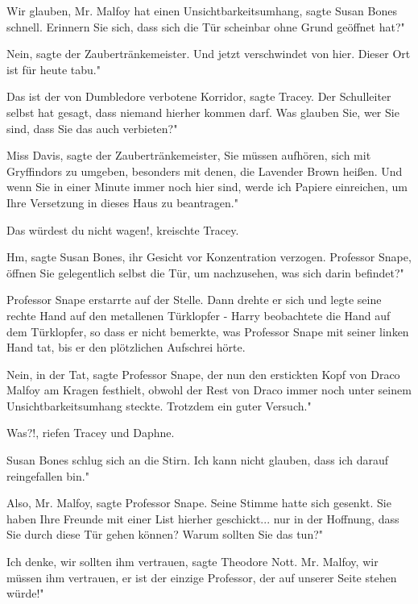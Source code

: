 \glqq Wir glauben, Mr. Malfoy hat einen Unsichtbarkeitsumhang\grqq{}, sagte
Susan Bones schnell. \glqq Erinnern Sie sich, dass sich die Tür scheinbar ohne
Grund geöffnet hat?"

\glqq Nein\grqq{}, sagte der Zaubertränkemeister. \glqq Und jetzt verschwindet
von hier. Dieser Ort ist für heute tabu."

\glqq Das ist der von Dumbledore verbotene Korridor\grqq{}, sagte Tracey. \glqq
Der Schulleiter selbst hat gesagt, dass niemand hierher kommen darf. Was glauben
Sie, wer Sie sind, dass Sie das auch verbieten?"

\glqq Miss Davis\grqq{}, sagte der Zaubertränkemeister, \glqq Sie müssen
aufhören, sich mit Gryffindors zu umgeben, besonders mit denen, die Lavender
Brown heißen. Und wenn Sie in einer Minute immer noch hier sind, werde ich
Papiere einreichen, um Ihre Versetzung in dieses Haus zu beantragen."

\glqq Das würdest du nicht wagen!\grqq{}, kreischte Tracey.

\glqq Hm\grqq{}, sagte Susan Bones, ihr Gesicht vor Konzentration verzogen.
\glqq Professor Snape, öffnen Sie gelegentlich selbst die Tür, um nachzusehen,
was sich darin befindet?"

Professor Snape erstarrte auf der Stelle. Dann drehte er sich und legte seine
rechte Hand auf den metallenen Türklopfer - Harry beobachtete die Hand auf dem
Türklopfer, so dass er nicht bemerkte, was Professor Snape mit seiner linken
Hand tat, bis er den plötzlichen Aufschrei hörte.

\glqq Nein, in der Tat\grqq{}, sagte Professor Snape, der nun den erstickten
Kopf von Draco Malfoy am Kragen festhielt, obwohl der Rest von Draco immer noch
unter seinem Unsichtbarkeitsumhang steckte. \glqq Trotzdem ein guter Versuch."

\glqq Was?!\grqq{}, riefen Tracey und Daphne.

Susan Bones schlug sich an die Stirn. \glqq Ich kann nicht glauben, dass ich
darauf reingefallen bin."

\glqq Also, Mr. Malfoy\grqq{}, sagte Professor Snape. Seine Stimme hatte sich
gesenkt. \glqq Sie haben Ihre Freunde mit einer List hierher geschickt... nur in
der Hoffnung, dass Sie durch diese Tür gehen können? Warum sollten Sie das tun?"

\glqq Ich denke, wir sollten ihm vertrauen\grqq{}, sagte Theodore Nott. \glqq
Mr. Malfoy, wir müssen ihm vertrauen, er ist der einzige Professor, der auf
unserer Seite stehen würde!"

